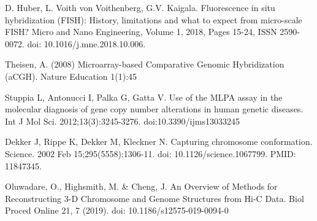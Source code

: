 \documentclass[a4paper,12pt]{article}
\begin{document}
\begin{thebibliography}{100}
D. Huber, L. Voith von Voithenberg, G.V. Kaigala. Fluorescence in situ hybridization (FISH): History, limitations and what to expect from micro-scale FISH? Micro and Nano Engineering, Volume 1, 2018, Pages 15-24, ISSN 2590-0072. doi: 10.1016/j.mne.2018.10.006.

Theisen, A. (2008) Microarray-based Comparative Genomic Hybridization (aCGH). Nature Education 1(1):45

Stuppia L, Antonucci I, Palka G, Gatta V. Use of the MLPA assay in the molecular diagnosis of gene copy number alterations in human genetic diseases. Int J Mol Sci. 2012;13(3):3245-3276. doi:10.3390/ijms13033245

Dekker J, Rippe K, Dekker M, Kleckner N. Capturing chromosome conformation. Science. 2002 Feb 15;295(5558):1306-11. doi: 10.1126/science.1067799. PMID: 11847345.

Oluwadare, O., Highsmith, M. \& Cheng, J. An Overview of Methods for Reconstructing 3-D Chromosome and Genome Structures from Hi-C Data. Biol Proced Online 21, 7 (2019). doi: 10.1186/s12575-019-0094-0

\end{thebibliography}
\end{document}
